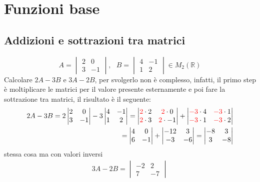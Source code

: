 \chapter{Funzioni base}
\label{chap:funbase}

\section{Addizioni e sottrazioni tra matrici}
\label{sec:addesottmtx}

\begin{equation}
  \label{eq:es1}
  A=
  \begin{vmatrix}
    2 & 0 \\
    3 & -1
  \end{vmatrix}, \text{ } B=
  \begin{vmatrix}
    4 & -1\\
    1 & 2
  \end{vmatrix} \in M_2(\mathds{R})
\end{equation}
Calcolare $2A-3B$ e $3A-2B$, per svolgerlo non è complesso, infatti, il primo
step è moltiplicare le matrici per il valore presente esternamente e poi fare
la sottrazione tra matrici, il risultato è il seguente:
\begin{eqnarray*}
  \label{eq:es1_sv}
  2A-3B = 2 \begin{vmatrix}
    2 & 0 \\
    3 & -1
  \end{vmatrix} - 3\begin{vmatrix}
    4 & -1\\
    1 & 2
  \end{vmatrix}=\begin{vmatrix}
    {\color{red}2}\cdot2 & {\color{red}2}\cdot0 \\
    {\color{red}2}\cdot3 & {\color{red}2}\cdot-1
  \end{vmatrix} +\begin{vmatrix}
    {\color{red}-3}\cdot4 & {\color{red}-3}\cdot1\\
    {\color{red}-3}\cdot1 & {\color{red}-3}\cdot2
                 \end{vmatrix}\\
  =
  \begin{vmatrix}
    4 &0\\
    6 &-1
  \end{vmatrix} +
  \begin{vmatrix}
    -12 & 3\\
    -3 &-6
  \end{vmatrix}=
  \begin{vmatrix}
    -8 & 3\\
    3 & -8
  \end{vmatrix}
\end{eqnarray*}
stessa cosa ma con valori inversi 
\begin{eqnarray*}
  3A-2B=
  \begin{vmatrix}
    -2 & 2 \\
    7 & -7
  \end{vmatrix}
\end{eqnarray*}

